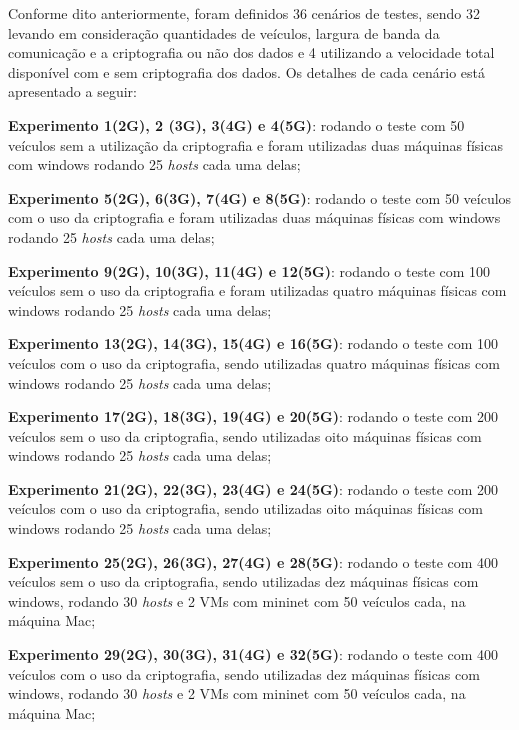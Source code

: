 \documentclass[
	12pt,				%
	oneside,			%
	a4paper,			%
	english,			%
	brazil				%
	]{abntex2ppgsi}
\begin{document}
Conforme dito anteriormente, foram definidos 36 cenários de testes, sendo 32 levando em consideração quantidades de veículos, largura de banda da comunicação e a criptografia ou não dos dados e 4 utilizando a velocidade total disponível com e sem criptografia dos dados. Os detalhes de cada cenário está apresentado a seguir:

\begin{itemize*}
	\item{\textbf{Experimento 1(2G), 2 (3G), 3(4G) e 4(5G)}: rodando o teste com 50  veículos sem a utilização da criptografia e foram utilizadas duas máquinas físicas com windows rodando 25 \textit{hosts} cada uma delas;}
	\item{\textbf{Experimento 5(2G), 6(3G), 7(4G) e 8(5G)}: rodando o teste com 50  veículos com o uso da criptografia e  foram utilizadas duas máquinas físicas com windows rodando 25 \textit{hosts} cada uma delas;}
	\item{\textbf{Experimento 9(2G), 10(3G), 11(4G) e 12(5G)}: rodando o teste com 100  veículos sem o uso da criptografia e foram utilizadas quatro máquinas físicas com windows rodando 25 \textit{hosts} cada uma delas;}
	\item{\textbf{Experimento 13(2G), 14(3G), 15(4G) e 16(5G)}: rodando o teste com 100  veículos com o uso da criptografia, sendo utilizadas quatro máquinas físicas com windows rodando 25 \textit{hosts} cada uma delas;}
	\item{\textbf{Experimento 17(2G), 18(3G), 19(4G) e 20(5G)}: rodando o teste com 200  veículos sem o uso da criptografia, sendo utilizadas oito máquinas físicas com windows rodando 25 \textit{hosts} cada uma delas;}
	\item{\textbf{Experimento 21(2G), 22(3G), 23(4G) e 24(5G)}: rodando o teste com 200  veículos com o uso da criptografia, sendo utilizadas oito máquinas físicas com windows rodando 25 \textit{hosts} cada uma delas;}
	\item{\textbf{Experimento 25(2G), 26(3G), 27(4G) e 28(5G)}: rodando o teste com 400  veículos sem o uso da criptografia, sendo utilizadas dez máquinas físicas com windows, rodando 30 \textit{hosts} e 2 VMs com mininet com 50 veículos cada, na máquina Mac;}
	\item{\textbf{Experimento 29(2G), 30(3G), 31(4G) e 32(5G)}: rodando o teste com 400  veículos com o uso da criptografia, sendo utilizadas dez máquinas físicas com windows, rodando 30 \textit{hosts} e 2 VMs com mininet com 50 veículos cada, na máquina Mac;}
	

\end{itemize*}
\end{document}
